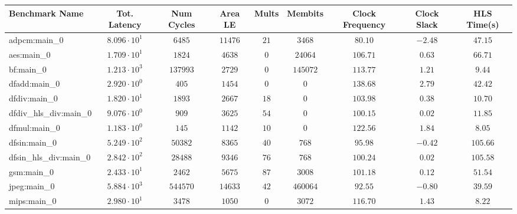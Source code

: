 \begin{tabular}{|l|c|c|c|c|c|c|c|c|}
\hline
Benchmark Name          & Tot. Latency           & Num Cycles & Area LE   & Mults   & Membits    & Clock Frequency & Clock Slack & HLS Time(s) \\
\hline
adpcm:main\_0           & $ 8.096 \cdot 10^{1} $ & $ 6485   $ & $ 11476 $ & $ 21  $ & $ 3468   $ & $ 80.10       $ & $ -2.48   $ & $ 47.15   $ \\
aes:main\_0             & $ 1.709 \cdot 10^{1} $ & $ 1824   $ & $ 4638  $ & $ 0   $ & $ 24064  $ & $ 106.71      $ & $ 0.63    $ & $ 66.71   $ \\
bf:main\_0              & $ 1.213 \cdot 10^{3} $ & $ 137993 $ & $ 2729  $ & $ 0   $ & $ 145072 $ & $ 113.77      $ & $ 1.21    $ & $ 9.44    $ \\
dfadd:main\_0           & $ 2.920 \cdot 10^{0} $ & $ 405    $ & $ 1454  $ & $ 0   $ & $ 0      $ & $ 138.68      $ & $ 2.79    $ & $ 42.42   $ \\
dfdiv:main\_0           & $ 1.820 \cdot 10^{1} $ & $ 1893   $ & $ 2667  $ & $ 18  $ & $ 0      $ & $ 103.98      $ & $ 0.38    $ & $ 10.70   $ \\
dfdiv\_hls\_div:main\_0 & $ 9.076 \cdot 10^{0} $ & $ 909    $ & $ 3625  $ & $ 54  $ & $ 0      $ & $ 100.15      $ & $ 0.02    $ & $ 11.85   $ \\
dfmul:main\_0           & $ 1.183 \cdot 10^{0} $ & $ 145    $ & $ 1142  $ & $ 10  $ & $ 0      $ & $ 122.56      $ & $ 1.84    $ & $ 8.05    $ \\
dfsin:main\_0           & $ 5.249 \cdot 10^{2} $ & $ 50382  $ & $ 8365  $ & $ 40  $ & $ 768    $ & $ 95.98       $ & $ -0.42   $ & $ 105.66  $ \\
dfsin\_hls\_div:main\_0 & $ 2.842 \cdot 10^{2} $ & $ 28488  $ & $ 9346  $ & $ 76  $ & $ 768    $ & $ 100.24      $ & $ 0.02    $ & $ 105.58  $ \\
gsm:main\_0             & $ 2.433 \cdot 10^{1} $ & $ 2462   $ & $ 5675  $ & $ 87  $ & $ 3008   $ & $ 101.18      $ & $ 0.12    $ & $ 51.54   $ \\
jpeg:main\_0            & $ 5.884 \cdot 10^{3} $ & $ 544570 $ & $ 14633 $ & $ 42  $ & $ 460064 $ & $ 92.55       $ & $ -0.80   $ & $ 39.59   $ \\
mips:main\_0            & $ 2.980 \cdot 10^{1} $ & $ 3478   $ & $ 1050  $ & $ 0   $ & $ 3072   $ & $ 116.70      $ & $ 1.43    $ & $ 8.22    $ \\

\end{tabular}
